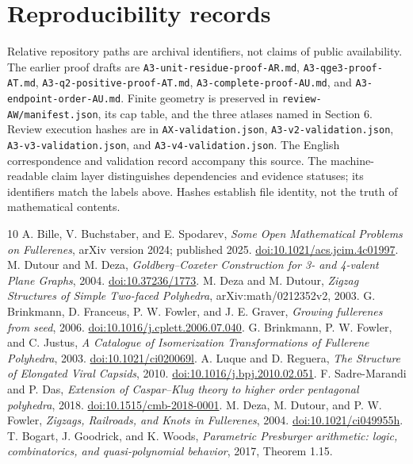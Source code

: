 \documentclass[11pt]{amsart}
\newcommand{\record}[1]{\nolinkurl{#1}}
\begin{document}
\section*{Reproducibility records}
Relative repository paths are archival identifiers, not claims of
public availability. The earlier proof drafts are
\record{A3-unit-residue-proof-AR.md}, \record{A3-qge3-proof-AT.md},
\record{A3-q2-positive-proof-AT.md}, \record{A3-complete-proof-AU.md},
and \record{A3-endpoint-order-AU.md}. Finite geometry is preserved in
\record{review-AW/manifest.json}, its cap table, and the three atlases
named in Section 6. Review execution hashes are in
\record{AX-validation.json}, \record{A3-v2-validation.json},
\record{A3-v3-validation.json}, and \record{A3-v4-validation.json}.
The English correspondence and validation record accompany this source.
The machine-readable claim layer distinguishes dependencies and
evidence statuses; its identifiers match the labels above. Hashes
establish file identity, not the truth of mathematical contents.

\begin{thebibliography}{10}
 A. Bille, V. Buchstaber, and E. Spodarev,
\emph{Some Open Mathematical Problems on Fullerenes}, arXiv version
2024; published 2025. \href{https://doi.org/10.1021/acs.jcim.4c01997}{doi:10.1021/acs.jcim.4c01997}.
 M. Dutour and M. Deza,
\emph{Goldberg--Coxeter Construction for 3- and 4-valent Plane Graphs},
2004. \href{https://doi.org/10.37236/1773}{doi:10.37236/1773}.
 M. Deza and M. Dutour,
\emph{Zigzag Structures of Simple Two-faced Polyhedra},
arXiv:math/0212352v2, 2003.
 G. Brinkmann, D. Franceus, P. W. Fowler, and J. E. Graver,
\emph{Growing fullerenes from seed}, 2006.
\href{https://doi.org/10.1016/j.cplett.2006.07.040}{doi:10.1016/j.cplett.2006.07.040}.
 G. Brinkmann, P. W. Fowler, and C. Justus,
\emph{A Catalogue of Isomerization Transformations of Fullerene Polyhedra},
2003. \href{https://doi.org/10.1021/ci020069l}{doi:10.1021/ci020069l}.
 A. Luque and D. Reguera,
\emph{The Structure of Elongated Viral Capsids}, 2010.
\href{https://doi.org/10.1016/j.bpj.2010.02.051}{doi:10.1016/j.bpj.2010.02.051}.
 F. Sadre-Marandi and P. Das,
\emph{Extension of Caspar--Klug theory to higher order pentagonal polyhedra},
2018. \href{https://doi.org/10.1515/cmb-2018-0001}{doi:10.1515/cmb-2018-0001}.
 M. Deza, M. Dutour, and P. W. Fowler,
\emph{Zigzags, Railroads, and Knots in Fullerenes}, 2004.
\href{https://doi.org/10.1021/ci049955h}{doi:10.1021/ci049955h}.
 T. Bogart, J. Goodrick, and K. Woods,
\emph{Parametric Presburger arithmetic: logic, combinatorics, and
quasi-polynomial behavior}, 2017, Theorem 1.15.
\end{thebibliography}
\end{document}
